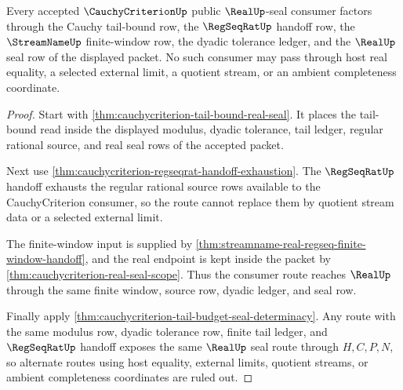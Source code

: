 \begin{theorem}
\label{thm:cauchycriterion-regseqrat-real-route-lock}
Every accepted $\CauchyCriterionUp$ public $\RealUp$-seal consumer factors
through the Cauchy tail-bound row, the $\RegSeqRatUp$ handoff row, the
$\StreamNameUp$ finite-window row, the dyadic tolerance ledger, and the
$\RealUp$ seal row of the displayed packet. No such consumer may pass through
host real equality, a selected external limit, a quotient stream, or an ambient
completeness coordinate.
\end{theorem}
\begin{proof}
Start with \autoref{thm:cauchycriterion-tail-bound-real-seal}. It places the
tail-bound read inside the displayed modulus, dyadic tolerance, tail ledger,
regular rational source, and real seal rows of the accepted packet.

Next use \autoref{thm:cauchycriterion-regseqrat-handoff-exhaustion}. The
$\RegSeqRatUp$ handoff exhausts the regular rational source rows available to
the CauchyCriterion consumer, so the route cannot replace them by quotient
stream data or a selected external limit.

The finite-window input is supplied by
\autoref{thm:streamname-real-regseq-finite-window-handoff}, and the real
endpoint is kept inside the packet by
\autoref{thm:cauchycriterion-real-seal-scope}. Thus the consumer route reaches
$\RealUp$ through the same finite window, source row, dyadic ledger, and seal
row.

Finally apply \autoref{thm:cauchycriterion-tail-budget-seal-determinacy}. Any
route with the same modulus row, dyadic tolerance row, finite tail ledger, and
$\RegSeqRatUp$ handoff exposes the same $\RealUp$ seal route through
$H,C,P,N$, so alternate routes using host equality, external limits, quotient
streams, or ambient completeness coordinates are ruled out.
\end{proof}

